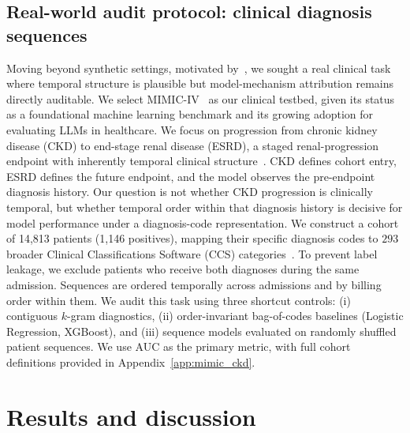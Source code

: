 \documentclass{article} %
\theoremstyle{plain}
\theoremstyle{definition}
\theoremstyle{remark}
\begin{document}
\subsection{Real-world audit protocol: clinical diagnosis sequences}
\label{subsec:mimic_ckd_protocol}
Moving beyond synthetic settings, motivated by~\citet{edelman2026order_specific_ehr}, we sought a real clinical task where temporal structure is plausible but model-mechanism attribution remains directly auditable. We select MIMIC-IV~\citep{johnson2024mimiciv31,johnson2023mimiciv} as our clinical testbed, given its status as a foundational machine learning benchmark and its growing adoption for evaluating LLMs in healthcare. We focus on progression from chronic kidney disease (CKD) to end-stage renal disease (ESRD), a staged renal-progression endpoint with inherently temporal clinical structure~\citep{kdigo2024ckd,sumida2017disease_trajectories_esrd}. CKD defines cohort entry, ESRD defines the future endpoint, and the model observes the pre-endpoint diagnosis history. Our question is not whether CKD progression is clinically temporal, but whether temporal order within that diagnosis history is decisive for model performance under a diagnosis-code representation. We construct a cohort of 14,813 patients (1,146 positives), mapping their specific diagnosis codes to $293$ broader Clinical Classifications Software (CCS) categories~\citep{hcup_ccs}. To prevent label leakage, we exclude patients who receive both diagnoses during the same admission. Sequences are ordered temporally across admissions and by billing order within them. We audit this task using three shortcut controls: (i) contiguous $k$-gram diagnostics, (ii) order-invariant bag-of-codes baselines (Logistic Regression, XGBoost), and (iii) sequence models evaluated on randomly shuffled patient sequences. We use AUC as the primary metric, with full cohort definitions provided in Appendix~\ref{app:mimic_ckd}.

\section{Results and discussion}
\label{sec:results}
\label{sec:discussion}
\end{document}
